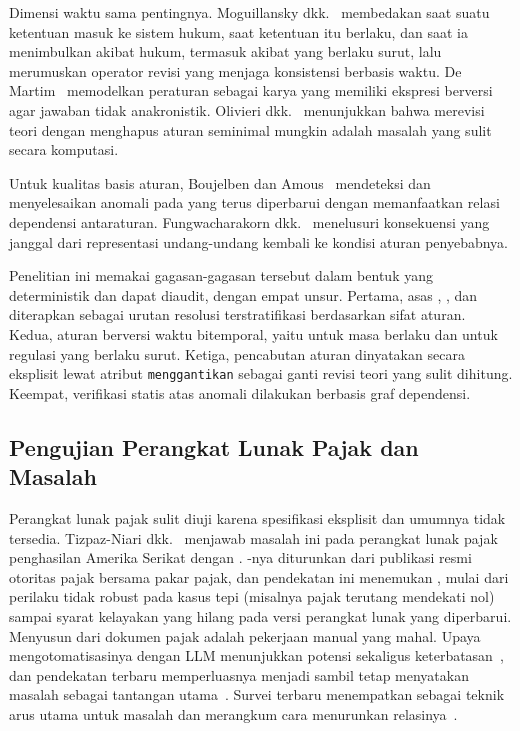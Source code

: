 Dimensi waktu sama pentingnya. Moguillansky dkk.~\cite{moguillansky2024temporalised} membedakan saat suatu ketentuan masuk ke sistem hukum, saat ketentuan itu berlaku, dan saat ia menimbulkan akibat hukum, termasuk akibat yang berlaku surut, lalu merumuskan operator revisi yang menjaga konsistensi berbasis waktu. De Martim~\cite{demartim2025satgraph} memodelkan peraturan sebagai karya yang memiliki ekspresi berversi agar jawaban tidak anakronistik. Olivieri dkk.~\cite{olivieri2025revising} menunjukkan bahwa merevisi teori  dengan menghapus aturan seminimal mungkin adalah masalah yang sulit secara komputasi.

Untuk kualitas basis aturan, Boujelben dan Amous~\cite{boujelben2025anomalies} mendeteksi dan menyelesaikan anomali pada  yang terus diperbarui dengan memanfaatkan relasi dependensi antaraturan. Fungwacharakorn dkk.~\cite{fungwacharakorn2021debugging} menelusuri konsekuensi yang janggal dari representasi undang-undang kembali ke kondisi aturan penyebabnya.

Penelitian ini memakai gagasan-gagasan tersebut dalam bentuk yang deterministik dan dapat diaudit, dengan empat unsur. Pertama, asas , , dan  diterapkan sebagai urutan resolusi terstratifikasi berdasarkan sifat aturan. Kedua, aturan berversi waktu bitemporal, yaitu  untuk masa berlaku dan  untuk regulasi yang berlaku surut. Ketiga, pencabutan aturan dinyatakan secara eksplisit lewat atribut \texttt{menggantikan} sebagai ganti revisi teori yang sulit dihitung. Keempat, verifikasi statis atas anomali dilakukan berbasis graf dependensi.

\subsection{Pengujian Perangkat Lunak Pajak dan Masalah }

Perangkat lunak pajak sulit diuji karena spesifikasi eksplisit dan  umumnya tidak tersedia. Tizpaz-Niari dkk.~\cite{tizpaz2023metamorphic} menjawab masalah ini pada perangkat lunak pajak penghasilan Amerika Serikat dengan . -nya diturunkan dari publikasi resmi otoritas pajak bersama pakar pajak, dan pendekatan ini menemukan , mulai dari perilaku tidak robust pada kasus tepi (misalnya pajak terutang mendekati nol) sampai syarat kelayakan yang hilang pada versi perangkat lunak yang diperbarui. Menyusun  dari dokumen pajak adalah pekerjaan manual yang mahal. Upaya mengotomatisasinya dengan  LLM menunjukkan potensi sekaligus keterbatasan~\cite{srinivas2023fewshot}, dan pendekatan  terbaru memperluasnya menjadi  sambil tetap menyatakan masalah  sebagai tantangan utama~\cite{khiabani2026agentic}. Survei terbaru menempatkan  sebagai teknik arus utama untuk masalah  dan merangkum cara menurunkan relasinya~\cite{li2025mrgeneration}.

